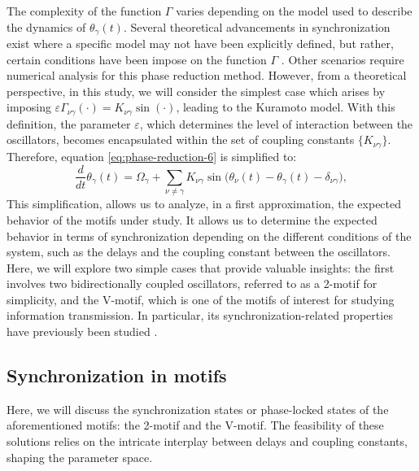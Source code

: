 \documentclass[../main.tex]{subfiles}
\begin{document}
The complexity of the function ${\Gamma}$ varies depending on the model used to describe the dynamics of $\theta_\gamma(t)$. 
Several theoretical advancements in synchronization exist where a specific model may not have been explicitly defined, but rather, certain conditions have been impose on the function $\Gamma$ \citep{Mallada_2013,esfahani_zero-lag_2014,sadeghi_synchronization_2014,KOKSALERSOZ201746,pariz_transmission_2021}.
Other scenarios require numerical analysis for this phase reduction method.
However, from a theoretical perspective, in this study, we will consider the simplest case which arises by imposing $\varepsilon\Gamma_{\nu\gamma}(\cdot) = K_{\nu\gamma}\sin(\cdot)$, leading to the Kuramoto model.
With this definition, the parameter $\varepsilon$, which determines the level of interaction between the oscillators, becomes encapsulated within the set of coupling constants $\{K_{\nu\gamma}\}$.
Therefore, equation \eqref{eq:phase-reduction-6} is simplified to:
\begin{equation}
    \displaystyle\frac{d}{dt}\theta_\gamma(t) = \Omega_\gamma + \sum_{\nu\ne\gamma}K_{\nu\gamma}\sin\big(\theta_\nu(t)-\theta_\gamma(t)-\delta_{\nu\gamma}\big),
    \label{eq:phase-reduction-kuramoto}
\end{equation}
This simplification, allows us to analyze, in a first approximation, the expected behavior of the motifs under study.
It allows us to determine the expected behavior in terms of synchronization depending on the different conditions of the system, such as the delays and the coupling constant between the oscillators.
Here, we will explore two simple cases that provide valuable insights: the first involves two bidirectionally coupled oscillators, referred to as a 2-motif for simplicity, and the V-motif, which is one of the motifs of interest for studying information transmission.
In particular, its synchronization-related properties have previously been studied \citep{esfahani_zero-lag_2014,sadeghi_synchronization_2014,gollo_dynamic_2010,mirasso_anticipated_2017,pariz_high_2018}.
\clearpage
\subsection{Synchronization in motifs}
Here, we will discuss the synchronization states or phase-locked states of the aforementioned motifs: the 2-motif and the V-motif.
The feasibility of these solutions relies on the intricate interplay between delays and coupling constants, shaping the parameter space.
\end{document}

